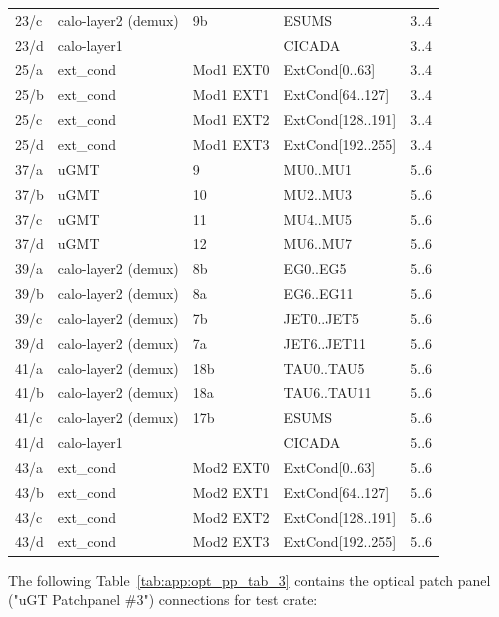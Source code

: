 \begin{longtable}{|l|l|l|l|c|}
23/c & calo-layer2 (demux) & 9b  & ESUMS & 3..4\\          
23/d & calo-layer1 &  & CICADA & 3..4\\
25/a & ext\_cond & Mod1 EXT0 & ExtCond[0..63] & 3..4 \\
25/b & ext\_cond & Mod1 EXT1 & ExtCond[64..127] & 3..4\\
25/c & ext\_cond & Mod1 EXT2 & ExtCond[128..191] & 3..4\\
25/d & ext\_cond & Mod1 EXT3 & ExtCond[192..255] & 3..4\\\hline
37/a & uGMT & 9  & MU0..MU1 & 5..6\\
37/b & uGMT & 10 & MU2..MU3 & 5..6\\
37/c & uGMT & 11 & MU4..MU5 & 5..6\\
37/d & uGMT & 12 & MU6..MU7 & 5..6\\
39/a & calo-layer2 (demux) & 8b & EG0..EG5 & 5..6\\
39/b & calo-layer2 (demux) & 8a & EG6..EG11 & 5..6\\
39/c & calo-layer2 (demux) & 7b & JET0..JET5 & 5..6\\
39/d & calo-layer2 (demux) & 7a & JET6..JET11 & 5..6\\
41/a & calo-layer2 (demux) & 18b & TAU0..TAU5 & 5..6\\
41/b & calo-layer2 (demux) & 18a & TAU6..TAU11 & 5..6\\
41/c & calo-layer2 (demux) & 17b & ESUMS & 5..6\\
41/d & calo-layer1 &  & CICADA & 5..6\\
43/a & ext\_cond & Mod2 EXT0 & ExtCond[0..63] & 5..6 \\
43/b & ext\_cond & Mod2 EXT1 & ExtCond[64..127] & 5..6\\
43/c & ext\_cond & Mod2 EXT2 & ExtCond[128..191] & 5..6\\
43/d & ext\_cond & Mod2 EXT3 & ExtCond[192..255] & 5..6\\\hline
\end{longtable}

The following Table~\ref{tab:app:opt_pp_tab_3} contains the optical patch panel ("uGT Patchpanel \#3") connections for test crate:

